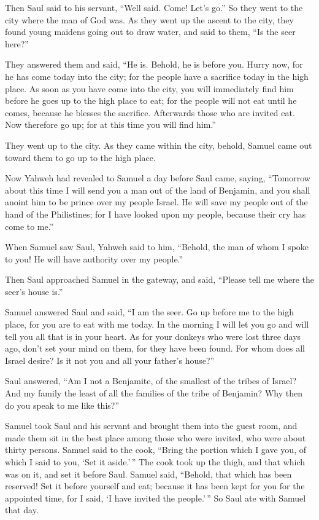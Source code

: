  Then Saul said to his servant, ``Well said. Come! Let's
go.'' So they went to the city where the man of God was. 
As they went up the ascent to the city, they found young maidens going
out to draw water, and said to them, ``Is the seer here?''

 They answered them and said, ``He is. Behold, he is
before you. Hurry now, for he has come today into the city; for the
people have a sacrifice today in the high place.  As soon
as you have come into the city, you will immediately find him before he
goes up to the high place to eat; for the people will not eat until he
comes, because he blesses the sacrifice. Afterwards those who are
invited eat. Now therefore go up; for at this time you will find him.''

 They went up to the city. As they came within the city,
behold, Samuel came out toward them to go up to the high place.

 Now Yahweh had revealed to Samuel a day before Saul
came, saying,  ``Tomorrow about this time I will send you
a man out of the land of Benjamin, and you shall anoint him to be prince
over my people Israel. He will save my people out of the hand of the
Philistines; for I have looked upon my people, because their cry has
come to me.''

 When Samuel saw Saul, Yahweh said to him, ``Behold, the
man of whom I spoke to you! He will have authority over my people.''

 Then Saul approached Samuel in the gateway, and said,
``Please tell me where the seer's house is.''

 Samuel answered Saul and said, ``I am the seer. Go up
before me to the high place, for you are to eat with me today. In the
morning I will let you go and will tell you all that is in your heart.
 As for your donkeys who were lost three days ago, don't
set your mind on them, for they have been found. For whom does all
Israel desire? Is it not you and all your father's house?''

 Saul answered, ``Am I not a Benjamite, of the smallest
of the tribes of Israel? And my family the least of all the families of
the tribe of Benjamin? Why then do you speak to me like this?''

 Samuel took Saul and his servant and brought them into
the guest room, and made them sit in the best place among those who were
invited, who were about thirty persons.  Samuel said to
the cook, ``Bring the portion which I gave you, of which I said to you,
`Set it aside.'\,''  The cook took up the thigh, and that
which was on it, and set it before Saul. Samuel said, ``Behold, that
which has been reserved! Set it before yourself and eat; because it has
been kept for you for the appointed time, for I said, `I have invited
the people.'\,'' So Saul ate with Samuel that day.

